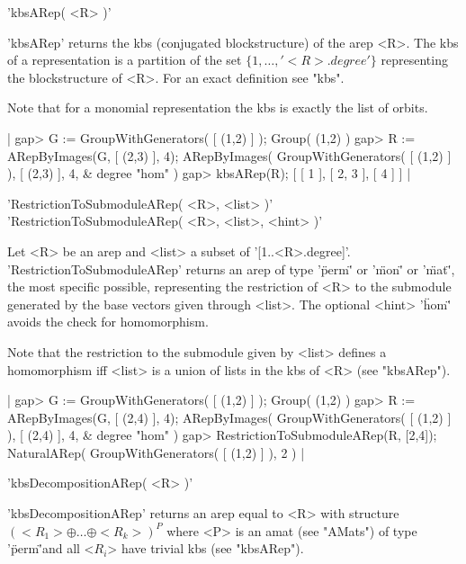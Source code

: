 
'kbsARep( <R> )'

'kbsARep' returns the kbs (conjugated blockstructure) 
of the arep <R>. The kbs of a representation is a partition
of the set $\{1,\dots,'<R>.degree'\}$ representing the blockstructure
of <R>. For an exact definition see "kbs".

Note that for a monomial representation the kbs is exactly the
list of orbits.

|    gap> G := GroupWithGenerators( [ (1,2) ] );
    Group( (1,2) )
    gap> R := ARepByImages(G, [ (2,3) ], 4);                                  
    ARepByImages(
      GroupWithGenerators( [ (1,2) ] ),
      [ (2,3) ],
      4, & degree
      "hom"
    )
    gap> kbsARep(R);
    [ [ 1 ], [ 2, 3 ], [ 4 ] ] |


'RestrictionToSubmoduleARep( <R>, <list> )'\\
'RestrictionToSubmoduleARep( <R>, <list>, <hint> )'

Let <R> be an arep and <list> a subset of '[1..<R>.degree]'. 
'RestrictionToSubmoduleARep' returns an arep of type 
'\"perm\"' or '\"mon\"' or '\"mat\"', the most specific 
possible, representing the restriction of <R> to the submodule
generated by the base vectors given through <list>.
The optional <hint> '\"hom\"' avoids the check for homomorphism.

Note that the restriction to the submodule given by <list>
defines a homomorphism iff <list> is a union of lists in the
kbs of <R> (see "kbsARep").

|    gap> G := GroupWithGenerators( [ (1,2) ] );
    Group( (1,2) )
    gap> R := ARepByImages(G, [ (2,4) ], 4);  
    ARepByImages(
      GroupWithGenerators( [ (1,2) ] ),
      [ (2,4) ],
      4, & degree
      "hom"
    )
    gap> RestrictionToSubmoduleARep(R, [2,4]);
    NaturalARep( GroupWithGenerators( [ (1,2) ] ), 2 ) |


'kbsDecompositionARep( <R> )'

'kbsDecompositionARep' returns an arep equal to <R> with
structure $(<R_1>\oplus\dots\oplus<R_k>)^P$ where <P> is 
an amat (see "AMats") of type '\"perm\"'and all <$R_i$> have 
trivial kbs (see "kbsARep").

